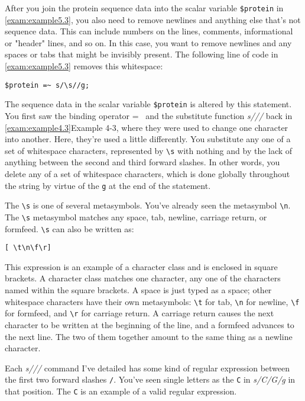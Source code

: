 After you join the protein sequence data into the scalar variable \verb|$protein| in \autoref{exam:example5.3}, you also need to remove newlines and anything else that's not sequence data. This can include numbers on the lines, comments, informational or "header" lines, and so on. In this case, you want to remove newlines and any spaces or tabs that might be invisibly present. The following line of code in \autoref{exam:example5.3} removes this whitespace:

\begin{lstlisting}
$protein =~ s/\s//g;
\end{lstlisting}

The sequence data in the scalar variable \verb|$protein| is altered by this statement. You first saw the binding operator =~ and the substitute function \textit{s///} back in \autoref{exam:example4.3}Example 4-3, where they were used to change one character into another. Here, they're used a little differently. You substitute any one of a set of whitespace characters, represented by \verb|\s| with nothing and by the lack of anything between the second and third forward slashes. In other words, you delete any of a set of whitespace characters, which is done globally throughout the string by virtue of the \verb|g| at the end of the statement.

The \verb|\s| is one of several metasymbols. You've already seen the metasymbol \verb|\n|. The \verb|\s| metasymbol matches any space, tab, newline, carriage return, or formfeed. \verb|\s| can also be written as: 

\begin{lstlisting}
[ \t\n\f\r]
\end{lstlisting}

This expression is an example of a character class and is enclosed in square brackets. A character class matches one character, any one of the characters named within the square brackets. A space is just typed as a space; other whitespace characters have their own metasymbols: \verb|\t| for tab, \verb|\n| for newline, \verb|\f| for formfeed, and \verb|\r| for carriage return. A carriage return causes the next character to be written at the beginning of the line, and a formfeed advances to the next line. The two of them together amount to the same thing as a newline character.

Each \textit{s///} command I've detailed has some kind of regular expression between the first two forward slashes \verb|/|. You've seen single letters as the \verb|C| in \textit{s/C/G/g} in that position. The \verb|C| is an example of a valid regular expression.

